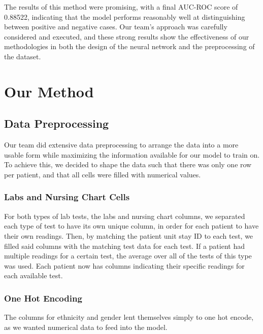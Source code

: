 \documentclass{article}
\begin{document}
The results of this method were promising, with a final AUC-ROC score of 0.88522, indicating that the model performs reasonably well at distinguishing between positive and negative cases. Our team's approach was carefully considered and executed, and these strong results show the effectiveness of our methodologies in both the design of the neural network and the preprocessing of the dataset. 

\section{Our Method}

\subsection{Data Preprocessing}
\label{sssec:preproc}
Our team did extensive data preprocessing to arrange the data into a more usable form while maximizing the information available for our model to train on. To achieve this, we decided to shape the data such that there was only one row per patient, and that all cells were filled with numerical values. 

\subsubsection{Labs and Nursing Chart Cells}

For both types of lab tests, the labs and nursing chart columns, we separated each type of test to have its own unique column, in order for each patient to have their own readings. Then, by matching the patient unit stay ID to each test, we filled said columns with the matching test data for each test. If a patient had multiple readings for a certain test, the average over all of the tests of this type was used. Each patient now has columns indicating their specific readings for each available test. \\

\subsubsection{One Hot Encoding}

The columns for ethnicity and gender lent themselves simply to one hot encode, as we wanted numerical data to feed into the model. 
\end{document}
